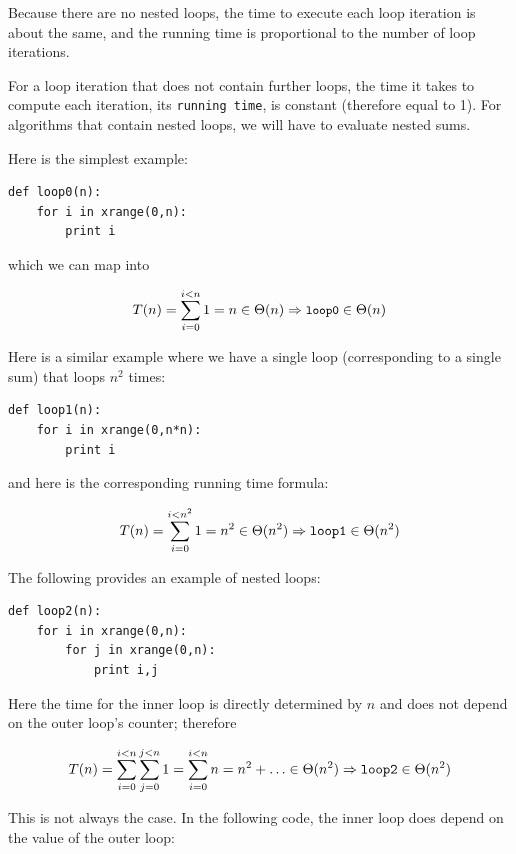 \documentclass[justified,sixbynine]{tufte-book}
\def\ft{\small\tt}
\theoremstyle{plain}%
\theoremstyle{definition}
\theoremstyle{remark}
\begin{document}
\begin{fullwidth}
Because there are no nested loops, the time to execute each loop iteration is about the same, and the running time is proportional to the number of loop iterations.

For a loop iteration that does not contain further loops, the time it takes to compute each iteration, its {\ft running time}, is constant (therefore equal to 1). For algorithms that contain nested loops, we will have to evaluate nested sums.

Here is the simplest example:

\begin{lstlisting}
def loop0(n):
    for i in xrange(0,n):
        print i
\end{lstlisting}

which we can map into

\begin{equation}
T(n)=\sum_{i=0}^{i<n}1=n\in \Theta (n)\Rightarrow \text{{\ft loop0}}\in
\Theta (n)
\end{equation}

Here is a similar example where we have a single loop (corresponding to a single sum) that loops $n^2$ times:

\begin{lstlisting}
def loop1(n):
    for i in xrange(0,n*n):
        print i
\end{lstlisting}

and here is the corresponding running time formula:

\begin{equation}
T(n)=\sum_{i=0}^{i<n^2}1=n^2\in \Theta (n^2)\Rightarrow \text{{\tt loop1}}%
\in \Theta (n^2)
\end{equation}

The following provides an example of nested loops:

\begin{lstlisting}
def loop2(n):
    for i in xrange(0,n):
        for j in xrange(0,n):
            print i,j
\end{lstlisting}

Here the time for the inner loop is directly determined by $n$ and does not depend on the outer loop's counter; therefore

\begin{equation}
T(n)=\sum_{i=0}^{i<n}\sum_{j=0}^{j<n}1=\sum_{i=0}^{i<n}n=n^2+\ldots\in \Theta
(n^2)\Rightarrow \text{{\tt loop2}}\in \Theta (n^2)
\end{equation}

This is not always the case. In the following code, the inner loop does depend on the value of the outer loop:


\end{fullwidth}
\end{document}
